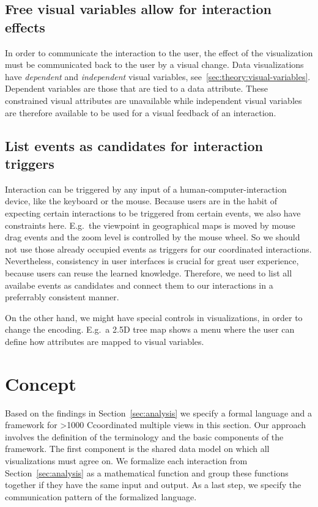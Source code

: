 \documentclass{article}
\newcommand\hmm[1]{\ifnum\ifhmode\spacefactor\else2000\fi>1000 \uppercase{#1}\else#1\fi}
\newcommand{\cmvs}{\hmm{c}oordinated multiple views}
\newcommand{\tmap}{\textsc{2.5D} tree map}
\newenvironment{bullshit}{\color{gray}}{\ignorespacesafterend}
\begin{document}
\begin{bullshit}
\subsection{Free visual variables allow for interaction effects}

In order to communicate the interaction to the user, the effect of the visualization must be communicated back to the user by a visual change.
Data visualizations have \emph{dependent} and \emph{independent} visual variables, see~\ref{sec:theory:visual-variables}.
Dependent variables are those that are tied to a data attribute.
These constrained visual attributes are unavailable while independent visual variables are therefore available to be used for a visual feedback of an interaction.

\subsection{List events as candidates for interaction triggers}

Interaction can be triggered by any input of a human-computer-interaction device, like the keyboard or the mouse.
Because users are in the habit of expecting certain interactions to be triggered from certain events, we also have constraints here.
E.g.\ the viewpoint in geographical maps is moved by mouse drag events and the zoom level is controlled by the mouse wheel.
So we should not use those already occupied events as triggers for our coordinated interactions.
Nevertheless, consistency in user interfaces is crucial for great user experience, because users can reuse the learned knowledge.
Therefore, we need to list all availabe events as candidates and connect them to our interactions in a preferrably consistent manner.

On the other hand, we might have special controls in visualizations, in order to change the encoding.
E.g.\ a \tmap{} shows a menu where the user can define how attributes are mapped to visual variables.
\end{bullshit}


\clearpage
\section{Concept}\label{sec:concept}
Based on the findings in Section~\ref{sec:analysis} we specify a formal language and a framework for \cmvs{} in this section.
Our approach involves the definition of the terminology and the basic components of the framework.
The first component is the shared data model on which all visualizations must agree on.
We formalize each interaction from Section~\ref{sec:analysis} as a mathematical function and group these functions together if they have the same input and output.
As a last step, we specify the communication pattern of the formalized language.
\end{document}
